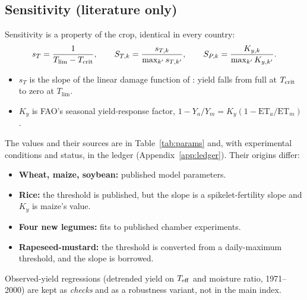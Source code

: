 \subsection{Sensitivity (literature only)}\label{sec:sensitivity}
Sensitivity is a property of the crop, identical in every country:
\begin{equation}\label{eq:sens}
s_T = \frac{1}{T_{\lim}-T_{\mathrm{crit}}},\qquad S_{T,k} = \frac{s_{T,k}}{\max_{k'} s_{T,k'}},\qquad S_{P,k} = \frac{K_{y,k}}{\max_{k'} K_{y,k'}}.
\end{equation}
\begin{itemize}
\item $s_T$ is the slope of the linear damage function of \citet{deryng2014}: yield falls from full at $T_{\mathrm{crit}}$ to
zero at $T_{\lim}$.
\item $K_y$ is FAO's seasonal yield-response factor, $1-Y_a/Y_m = K_y(1-\mathrm{ET}_a/\mathrm{ET}_m)$
\citep{fao66}.
\end{itemize}
The values and their sources are in Table~\ref{tab:params} and, with experimental conditions and status, in the
ledger (Appendix~\ref{app:ledger}). Their origins differ:
\begin{itemize}
\item \textbf{Wheat, maize, soybean:} published model parameters.
\item \textbf{Rice:} the threshold is published, but the slope is a spikelet-fertility slope and $K_y$ is maize's
value.
\item \textbf{Four new legumes:} fits to published chamber experiments.
\item \textbf{Rapeseed-mustard:} the threshold is converted from a daily-maximum threshold, and the slope is
borrowed.
\end{itemize}
Observed-yield regressions (detrended yield on $T_{\mathrm{eff}}$ and moisture ratio, 1971--2000) are kept as
\emph{checks} and as a robustness variant, not in the main index.

\begin{table}[H]\centering\small
\caption{Crop parameters used by the index (from ).}\label{tab:params}
\end{table}

